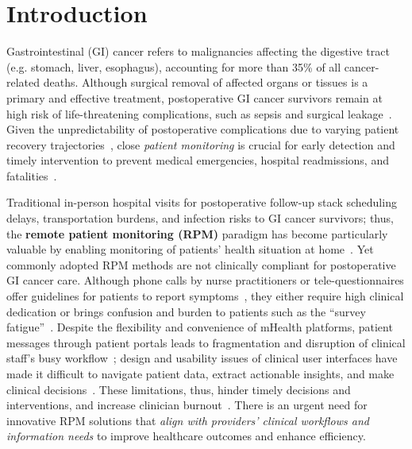 \section{Introduction}


Gastrointestinal (GI) cancer refers to malignancies affecting the digestive tract  (e.g. stomach, liver, esophagus), accounting for more than 35\% of all cancer-related deaths.
Although surgical removal of affected organs or tissues is a primary and effective treatment,  postoperative GI cancer survivors remain at high risk of life-threatening complications, such as sepsis and surgical leakage~\cite{brenkman2016worldwide, cousins2016surgery}.
Given the unpredictability of postoperative complications due to varying patient recovery trajectories~\cite{vankootenPreoperativeRiskFactors2021}, close \textit{patient monitoring} is crucial for early detection and timely intervention to prevent medical emergencies, hospital readmissions, and fatalities~\cite{sempleUsingMobileApp2015, cardellaComplianceAttitudesBarriers2008}.




Traditional in-person hospital visits for postoperative follow-up stack scheduling delays, transportation burdens, and infection risks to GI cancer survivors; thus, the \textbf{remote patient monitoring (RPM)} paradigm has become particularly valuable by enabling monitoring of patients' health situation at home~\cite{malasingheRemotePatientMonitoring2019}. Yet commonly adopted RPM methods are not clinically compliant for postoperative GI cancer care.
Although phone calls by nurse practitioners or tele-questionnaires offer guidelines for patients to report symptoms~\cite{malasingheRemotePatientMonitoring2019, silva_ostomy_2020}, they either require high clinical dedication or brings confusion and burden to patients such as the ``survey fatigue''~\cite{pannunzio2024patient, leon2022impact, pannunzio2024patient, li2024beyond}.
Despite the flexibility and convenience of mHealth platforms, patient messages through patient portals leads to fragmentation and disruption of clinical staff's busy workflow~\cite{pannunzio2024patient, leon2022impact}; design and usability issues of clinical user interfaces have made it difficult to navigate patient data, extract actionable insights, and make clinical decisions~\cite{zhangRethinkingHumanAICollaboration2024}. These limitations, thus, hinder timely decisions and interventions, and increase clinician burnout~\cite{cardellaComplianceAttitudesBarriers2008, yangWishThereWere2024}. There is an urgent need for innovative RPM solutions that \textit{align with providers' clinical workflows and information needs} to improve healthcare outcomes and enhance efficiency. 

